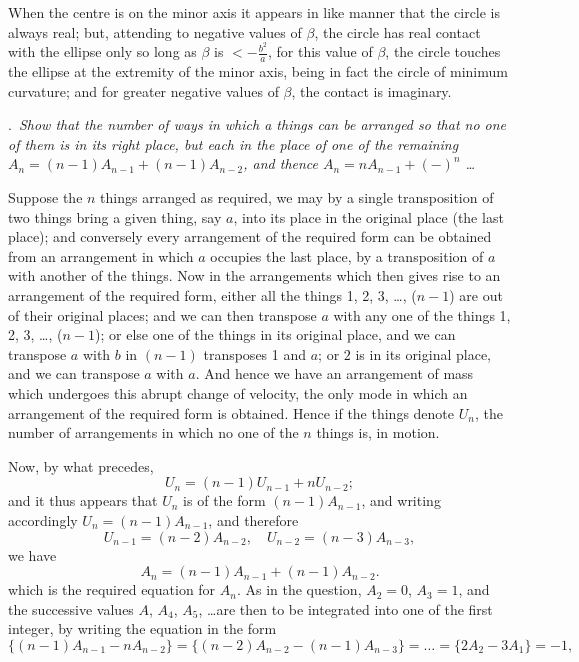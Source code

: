 \documentclass[11pt,a4paper]{book}
\begin{document}
When the centre is on the minor axis it appears in like manner that the circle
is always real; but, attending to negative values of $\beta$, the circle has real contact
with the ellipse only so long as $\beta$ is $< -\frac{b^2}{a}$, for this value of $\beta$, the circle touches
the ellipse at the extremity of the minor axis, being in fact the circle of minimum
curvature; and for greater negative values of $\beta$, the contact is imaginary.

\medskip
{}.\ \textit{Show that the number of ways in which a things can be arranged so that no
one of them is in its right place, but each in the place of one of the remaining
$A_n = (n-1)A_{n-1} + (n-1)A_{n-2}$, and thence $A_n = nA_{n-1} + (-)^n$ \dots}

\medskip
Suppose the $n$ things arranged as required, we may by a single transposition of
two things bring a given thing, say $a$, into its place in the original place (the last
place); and conversely every arrangement of the required form can be obtained from an arrangement in which $a$ occupies the last place, by a transposition of $a$ with another of the
things. Now in the arrangements which then gives rise to an arrangement of the
required form, either all the things 1, 2, 3, \ldots, ($n-1$) are out of their original places;
and we can then transpose $a$ with any one of the things 1, 2, 3, \ldots, ($n-1$); or else
one of the things in its original place, and we can transpose $a$ with $b$ in $(n-1)$
transposes 1 and $a$; or $2$ is in its original place, and we can transpose $a$ with $a$. And
hence we have an arrangement of mass which undergoes this abrupt change of velocity,
the only mode in which an arrangement of the required form is obtained. Hence if
the things denote $U_n$, the number of arrangements in which no one of the $n$ things
is, in motion.

\medskip
Now, by what precedes,
\[
U_n = (n-1)U_{n-1} + nU_{n-2};
\]
and it thus appears that $U_n$ is of the form $(n-1)A_{n-1}$, and writing accordingly
$U_n = (n-1)A_{n-1}$, and therefore
\[
U_{n-1} = (n-2)A_{n-2}, \quad U_{n-2} = (n-3)A_{n-3},
\]
we have
\[
A_n = (n-1)A_{n-1} + (n-1)A_{n-2}.
\]
which is the required equation for $A_n$. As in the question, $A_2 = 0$, $A_3 = 1$, and the
successive values $A$, $A_4$, $A_5$, \ldots are then to be integrated into one of the first integer, by
writing the equation in the form
\[
\{(n-1)A_{n-1} - n A_{n-2}\} = \{(n-2)A_{n-2} - (n-1)A_{n-3}\} = \ldots = \{2A_2 - 3A_1\} = -1,
\]

\clearpage
\end{document}
